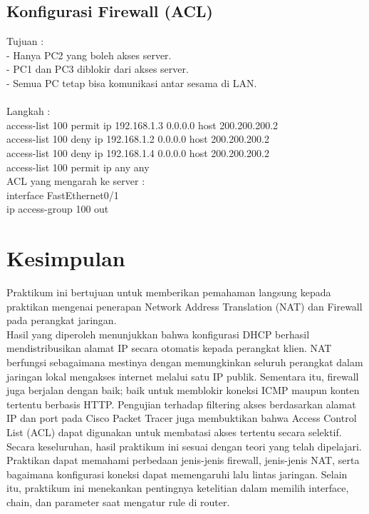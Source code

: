 \subsection{Konfigurasi Firewall (ACL)}
Tujuan : \\
- Hanya PC2 yang boleh akses server. \\
- PC1 dan PC3 diblokir dari akses server. \\
- Semua PC tetap bisa komunikasi antar sesama di LAN. \\ \\ 
Langkah : \\
access-list 100 permit ip 192.168.1.3 0.0.0.0 host 200.200.200.2 \\
access-list 100 deny ip 192.168.1.2 0.0.0.0 host 200.200.200.2 \\
access-list 100 deny ip 192.168.1.4 0.0.0.0 host 200.200.200.2 \\
access-list 100 permit ip any any \\
ACL yang mengarah ke server : \\
interface FastEthernet0/1 \\
 ip access-group 100 out

\section{Kesimpulan}
Praktikum ini bertujuan untuk memberikan pemahaman langsung kepada praktikan mengenai penerapan Network Address Translation (NAT) dan Firewall pada perangkat jaringan. \\ Hasil yang diperoleh menunjukkan bahwa konfigurasi DHCP berhasil mendistribusikan alamat IP secara otomatis kepada perangkat klien. NAT berfungsi sebagaimana mestinya dengan memungkinkan seluruh perangkat dalam jaringan lokal mengakses internet melalui satu IP publik. Sementara itu, firewall juga berjalan dengan baik; baik untuk memblokir koneksi ICMP maupun konten tertentu berbasis HTTP. Pengujian terhadap filtering akses berdasarkan alamat IP dan port pada Cisco Packet Tracer juga membuktikan bahwa Access Control List (ACL) dapat digunakan untuk membatasi akses tertentu secara selektif. \\ Secara keseluruhan, hasil praktikum ini sesuai dengan teori yang telah dipelajari. Praktikan dapat memahami perbedaan jenis-jenis firewall, jenis-jenis NAT, serta bagaimana konfigurasi koneksi dapat memengaruhi lalu lintas jaringan. Selain itu, praktikum ini menekankan pentingnya ketelitian dalam memilih interface, chain, dan parameter saat mengatur rule di router.


